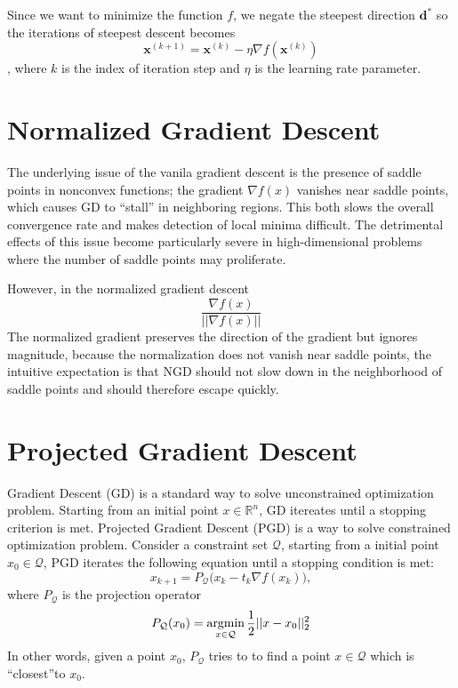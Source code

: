 	Since we want to minimize the function $f$, we negate the steepest direction $\mathbf{d}^{*}$ so the iterations of steepest descent becomes
	$$\mathbf{x}^{(k+1)} = \mathbf{x}^{(k)} - \eta \nabla f(\mathbf{x}^{(k)})$$
	, where $k$ is the index of iteration step and $\eta$ is the learning rate parameter.




\section{Normalized Gradient Descent}

The underlying issue of the vanila gradient descent is the presence of saddle points in nonconvex functions; the gradient $\nabla f(x)$ vanishes near saddle points, which causes GD to ``stall'' in neighboring regions. This both slows the overall convergence rate and makes detection of local minima difficult. The detrimental effects of this issue become particularly severe in high-dimensional problems where the number of saddle points may proliferate.


However, in the normalized gradient descent
$$ \frac{\nabla f(x)}{||\nabla f(x)||}$$
The normalized gradient preserves the direction of the gradient but ignores magnitude, because the normalization does not vanish near saddle points, the intuitive expectation is that NGD should not slow down in the neighborhood of saddle points and should therefore escape quickly. 

\section{Projected Gradient Descent}
Gradient Descent (GD) is a standard way to solve unconstrained optimization problem. Starting from an initial point $x\in \mathbb{R}^n$, GD itereates until a stopping criterion is met. Projected Gradient Descent (PGD) is a way to solve constrained optimization problem. Consider a constraint set $\mathcal{Q}$, starting from a initial point $x_0 \in \mathcal{Q}$, PGD iterates the following equation until a stopping condition is met:
$$x_{k+1} = P_\mathcal{Q} \Big(x_k - t_k \nabla f(x_k)\Big),$$
where $P_\mathcal{Q}$ is the projection operator
$$P_\mathcal{Q}(x_0) = \operatorname*{\operatorname{argmin}}_{x\in \mathcal{Q}} \frac{1}{2}||x-x_0||^2_2$$
In other words, given a point $x_0$, $P_\mathcal{Q}$ tries to to find a point $x\in \mathcal{Q}$ which is ``closest''to $x_0$.


